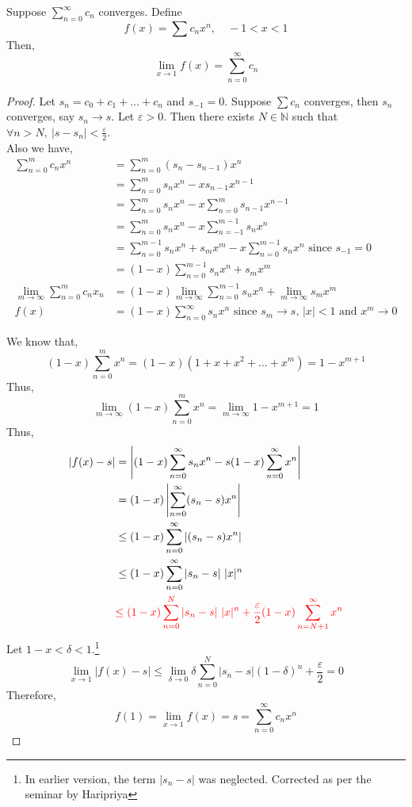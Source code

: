 \begin{theorem}
	Suppose $\displaystyle \sum_{n = 0}^\infty c_n$ converges.
	Define \[ f(x) = \sum c_n x^n,\quad -1<x<1 \]
	Then,
	\[ \lim_{x \to 1} f(x) = \sum_{n=0}^\infty c_n \]
\end{theorem}
\begin{proof}
	Let $s_n = c_0 + c_1 + \dots + c_n$ and $s_{-1} = 0$.
	Suppose $\sum c_n$ converges, then $s_n$ converges, say $s_n \to s$.
	Let $\varepsilon > 0$.
	Then there exists $N \in \mathbb{N}$ such that $\forall n > N,\ |s-s_n| < \frac{\varepsilon}{2}$.\\

	Also we have,
	\begin{align*}
		\sum_{n=0}^m c_n x^n
		& = \sum_{n=0}^m (s_n-s_{n-1})x^n \\
		& = \sum_{n=0}^m s_n x^n - xs_{n-1}x^{n-1} \\
		& = \sum_{n=0}^m s_nx^n - x\sum_{n=0}^{m}s_{n-1}x^{n-1} \\
		& = \sum_{n=0}^m s_nx^n - x\sum_{n=-1}^{m-1}s_nx^n \\
		& = \sum_{n=0}^{m-1} s_nx^n + s_mx^m - x\sum_{n=0}^{m-1}s_nx^n \text{ since $s_{-1} = 0$} \\
		& = (1-x)\sum_{n=0}^{m-1} s_nx^n + s_mx^m \\
		\lim_{m \to \infty} \sum_{n=0}^m c_n x_n
		& = (1-x) \lim_{m \to \infty} \sum_{n=0}^{m-1} s_nx^n + \lim_{m \to \infty} s_m x^m  \\
		f(x) & = (1-x) \sum_{n=0}^\infty s_nx^n \text{ since $s_m \to s$, $|x|<1$ and $x^m \to 0$}
	\end{align*}

	{\color{red}
	We know that,
	\[ (1-x)\sum_{n=0}^m x^n = (1-x)(1+x+x^2+\dots+x^m) = 1-x^{m+1} \]
	Thus,
	\[ \lim_{m \to \infty} (1-x)\sum_{n=0}^m x^n = \lim_{m \to \infty} 1-x^{m+1} = 1 \]
	}
	Thus,
	\begin{align*}
		|f(x) - s| 
		& = \left| (1-x)\sum_{n=0}^\infty s_nx^n - s(1-x)\sum_{n=0}^\infty x^n \right| \\
		& = (1-x) \left| \sum_{n=0}^\infty (s_n-s)x^n \right| \\
		& \le (1-x) \sum_{n=0}^\infty |(s_n-s)x^n| \\
		& \le (1-x)\sum_{n=0}^\infty |s_n-s|\ |x|^n  \\
		& {\color{red}\le (1-x)\sum_{n=0}^N |s_n-s|\ |x|^n +  \frac{\varepsilon}{2} (1-x) \sum_{n=N+1}^\infty x^n} \\
	\end{align*}
	{ \color{red}
	Let $1-x < \delta < 1$.\dag\footnote{
		In earlier version, the term $|s_n-s|$ was neglected.
		Corrected as per the seminar by Haripriya}
	\[ \lim_{x \to 1} |f(x) - s| \le \lim_{\delta \to 0} \delta \sum_{n=0}^N |s_n -s| (1-\delta)^n + \frac{\varepsilon}{2} = 0 \]
	}	
	Therefore, 
	\[ f(1) = \lim_{x \to 1} f(x) = s = \sum_{n = 0}^\infty c_nx^n \]
\end{proof}

